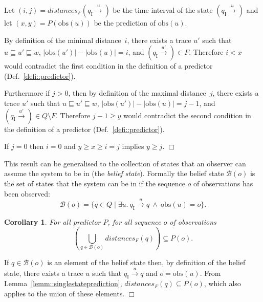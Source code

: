 \documentclass{article}
\newtheorem{coro}[lemm]{Corollary}
\newenvironment{proof}{\par\noindent{\bf Proof}}{\hspace{\stretch{1}}$\Box$}
\newcommand{\prefix}{\sqsubseteq}
\newcommand{\qi}[0]{q_{\mathrm{I}}}
\newcommand{\trans}[1]{\stackrel{#1}{\rightarrow}}
\newcommand{\obs}[0]{\mathrm{obs}}
\newcommand{\distances}{\mathit{distances}_F}
\newcommand{\belief}{\mathcal{B}}
\newcommand{\set}[1]{\{#1\}}
\begin{document}
\begin{proof}
  Let $(i,j) = \distances(\qi \trans{u})$ be the time interval 
  of the state $(\qi \trans{u})$ 
  and let $(x,y) = P(\obs(u))$ be the prediction of $\obs(u)$.  

  By definition of the minimal distance~$i$, 
  there exists a trace $u'$ 
  such that $u \prefix u' \prefix w$, 
  $|\obs(u')| - |\obs(u)| = i$, 
  and $(\qi \trans{u'}) \in F$.  
  Therefore $i < x$ would contradict the first condition 
  in the definition of a predictor (Def.~\ref{defi::predictor}).  

  Furthermore if $j > 0$, 
  then by definition of the maximal distance~$j$, 
  there exists a trace $u'$ 
  such that $u \prefix u' \prefix w$, 
  $|\obs(u')| - |\obs(u)| = j-1$, 
  and $(\qi \trans{u'}) \in Q \setminus F$.  
  Therefore $j-1 \ge y$ would contradict the second condition 
  in the definition of a predictor (Def.~\ref{defi::predictor}).  

  If $j = 0$ then $i = 0$ and $y \ge x \ge i = j$ implies $y \ge j$.  
\end{proof}

This result can be generalised to the collection of states 
that an observer can assume the system to be in 
(the \emph{belief state}).  
Formally the belief state $\belief(o)$ is the set of states 
that the system can be in if the sequence $o$ of observations 
has been observed: 
\begin{displaymath}
  \belief(o) = \set{ q \in Q \mid 
  \exists u.\ 
  \qi \trans{u} q\ \land\ \obs(u) = o}.  
\end{displaymath}

\begin{coro}\label{coro::predictorsupset}
  For all predictor $P$, 
  for all sequence $o$ of observations 
  \begin{displaymath}
    \left(\bigcup_{q \in \belief(o)} \distances(q) \right)
    \subseteq P(o).  
  \end{displaymath}
\end{coro}

\begin{proof}
  If $q \in \belief(o)$ is an element of the belief state 
  then, by definition of the belief state, 
  there exists a trace $u$ such that $\qi \trans{u} q$ 
  and $o = \obs(u)$.  
  From Lemma~\ref{lemm::singlestateprediction}, 
  $\distances(q) \subseteq P(o)$, 
  which also applies to the union of these elements.  
\end{proof}
\end{document}
